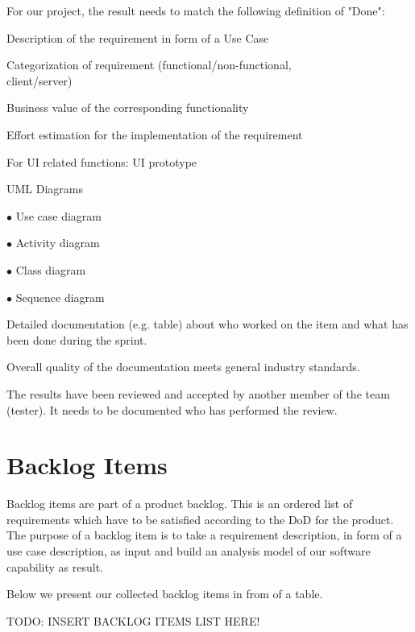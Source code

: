 \documentclass[a4paper, 12pt]{article}
\begin{document}
For our project, the result needs to match the following definition of "Done":
\begin{todolist}

\item Description of the requirement in form of a Use Case
\item Categorization of requirement (functional/non-functional,\\
      client/server)
\item Business value of the corresponding functionality
\item Effort estimation for the implementation of the requirement
\item For UI related functions: UI prototype
\item UML Diagrams 

    $\bullet$ Use case diagram
    
    $\bullet$ Activity diagram
    
    $\bullet$ Class diagram
    
    $\bullet$ Sequence diagram
    
\item Detailed documentation (e.g. table) about who worked on the item and what has been done during the sprint.
\item Overall quality of the documentation meets general industry standards.
\item The results have been reviewed and accepted by another member of the team (tester). It needs to be documented who has performed the review.

\end{todolist}


\section{Backlog Items}
Backlog items are part of a product backlog. This is an ordered list of requirements which have to be satisfied according to the DoD for the product. The purpose of a backlog item is to take a requirement description, in form of a use case description, as input and build an analysis model of our software capability as result.

Below we present our collected backlog items in from of a table.

\color{red}TODO: INSERT BACKLOG ITEMS LIST HERE!\color{black}


\end{document}
